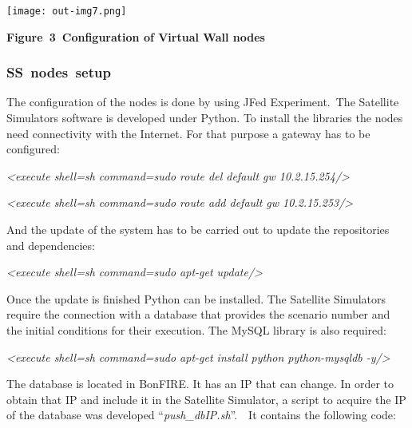 \documentclass[a4paper]{article}
\begin{document}
\bigskip

{\centering 
\texttt{[image: out-img7.png]} \par}

{\centering\bfseries
\label{bkm:Ref390077695}Figure\ 3\ Configuration of Virtual Wall nodes
\par}

\subsubsection[SS\ nodes\ setup]{SS\ nodes\ setup}
\hypertarget{Toc390097013}{}
\bigskip

The configuration of the nodes is done by using JFed Experiment.\ The
Satellite Simulators software is developed under Python. To install the
libraries the nodes need connectivity with the Internet. For that
purpose a gateway has to be configured:


\bigskip

{\itshape
{\textless}execute shell={\textquotedbl}sh{\textquotedbl}
command={\textquotedbl}sudo route del default gw
10.2.15.254{\textquotedbl}/{\textgreater}}

{\itshape
{\textless}execute shell={\textquotedbl}sh{\textquotedbl}
command={\textquotedbl}sudo route add default gw
10.2.15.253{\textquotedbl}/{\textgreater}}


\bigskip

And the update of the system has to be carried out to update the
repositories and dependencies:


\bigskip

{\itshape
{\textless}execute shell={\textquotedbl}sh{\textquotedbl}
command={\textquotedbl}sudo apt-get
update{\textquotedbl}/{\textgreater}}


\bigskip

Once the update is finished Python can be installed. The Satellite
Simulators require the connection with a database that provides the
scenario number and the initial conditions for their execution. The
MySQL library is also required:


\bigskip

{\itshape
{\textless}execute shell={\textquotedbl}sh{\textquotedbl}
command={\textquotedbl}sudo apt-get install python python-mysqldb
-y{\textquotedbl}/{\textgreater}}


\bigskip

The database is located in BonFIRE. It has an IP that can change. In
order to obtain that IP and include it in the Satellite Simulator, a
script to acquire the IP of the database was developed
{\textquotedblleft}\textit{push\_dbIP.sh}{\textquotedblright}.\ \ It
contains the following code:
\end{document}
